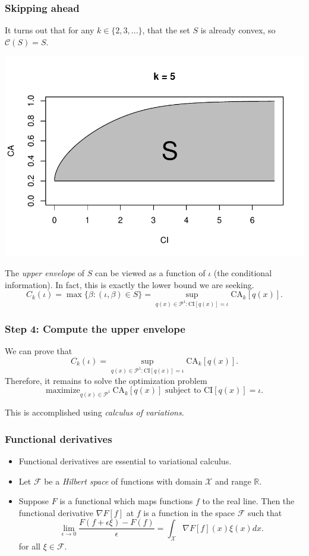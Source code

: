 \documentclass{beamer}
\begin{document}
\begin{frame}
\frametitle{Skipping ahead}
It turns out that for any $k \in \{2,3,...\}$, that the set $S$ is already convex, so $\mathcal{C}(S) = S$.
\begin{center}
\includegraphics[scale = 0.3]{S_plot_5.pdf}
\end{center}

The \emph{upper envelope} of $S$ can be viewed as a function of
$\iota$ (the conditional information).  In fact, this is exactly the lower bound we are seeking.
\[
C_k(\iota) = \max \{\beta: (\iota, \beta) \in S\} = \sup_{q(x) \in \mathcal{P}^1: \text{CI}[q(x)] = \iota}\text{CA}_k[q(x)].
\]
\end{frame}

\begin{frame}
\frametitle{Step 4: Compute the upper envelope}
We can prove that
\[
C_k(\iota) = \sup_{q(x) \in \mathcal{P}^1: \text{CI}[q(x)] = \iota}\text{CA}_k[q(x)].
\]
Therefore, it remains to solve the optimization problem
\[
\text{maximize}_{q(x) \in \mathcal{P}^1}\ \text{CA}_k[q(x)] \text{ subject to }\text{CI}[q(x)] = \iota.
\]

This is accomplished using \emph{calculus of variations}.
\end{frame}

\begin{frame}
\frametitle{Functional derivatives}
\begin{itemize}
\item Functional derivatives are essential to variational calculus.
\item Let $\mathcal{F}$ be a \emph{Hilbert space} of functions with domain $\mathcal{X}$ and range $\mathbb{R}$.
\item Suppose $F$ is a functional which maps functions $f$ to the real line.
Then the functional derivative $\nabla F[f]$ at $f$ is a function in the space $\mathcal{F}$ such that
\[
\lim_{\epsilon \to 0}\frac{F(f + \epsilon \xi) - F(f)}{\epsilon} = \int_{\mathcal{X}} \nabla F[f](x) \xi(x) dx.
\]
for all $\xi \in \mathcal{F}$.
\end{itemize}
\end{frame}
\end{document}
